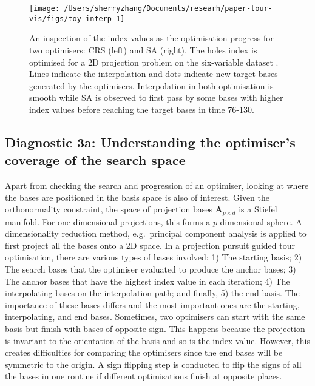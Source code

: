\begin{Schunk}
\begin{figure}

{\centering \texttt{[image: /Users/sherryzhang/Documents/researh/paper-tour-vis/figs/toy-interp-1]} 

}

\caption[An inspection of the index values as the optimisation progress for two optimisers]{An inspection of the index values as the optimisation progress for two optimisers: CRS (left) and SA (right). The holes index is optimised for a 2D projection problem on the six-variable dataset . Lines indicate the interpolation and dots indicate new target bases generated by the optimisers. Interpolation in both optimisation is smooth while SA is observed to first pass by some bases with higher index values before reaching the target bases in time 76-130.}\label{fig:toy-interp}
\end{figure}
\end{Schunk}

\hypertarget{toy-pca}{%
\subsection{Diagnostic 3a: Understanding the optimiser's coverage of the
search space}\label{toy-pca}}

Apart from checking the search and progression of an optimiser, looking
at where the bases are positioned in the basis space is also of
interest. Given the orthonormality constraint, the space of projection
bases \(\mathbf{A}_{p \times d}\) is a Stiefel manifold. For
one-dimensional projections, this forms a \(p\)-dimensional sphere. A
dimensionality reduction method, e.g.~principal component analysis is
applied to first project all the bases onto a 2D space. In a projection
pursuit guided tour optimisation, there are various types of bases
involved: 1) The starting basis; 2) The search bases that the optimiser
evaluated to produce the anchor bases; 3) The anchor bases that have the
highest index value in each iteration; 4) The interpolating bases on the
interpolation path; and finally, 5) the end basis. The importance of
these bases differs and the most important ones are the starting,
interpolating, and end bases. Sometimes, two optimisers can start with
the same basis but finish with bases of opposite sign. This happens
because the projection is invariant to the orientation of the basis and
so is the index value. However, this creates difficulties for comparing
the optimisers since the end bases will be symmetric to the origin. A
sign flipping step is conducted to flip the signs of all the bases in
one routine if different optimisations finish at opposite places.


